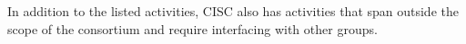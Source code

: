 In addition to the listed activities, CISC also has activities that span
outside the scope of the consortium and require interfacing with other
groups.

